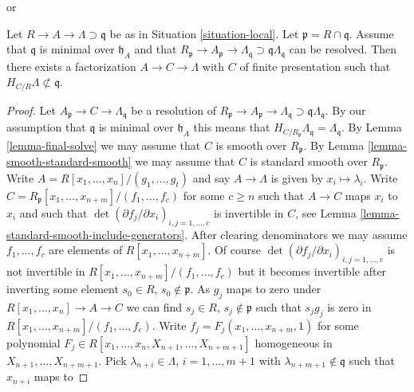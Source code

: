 \begin{lemma}
\label{lemma-delocalize-weak}
\begin{reference}
\cite[Lemma 12.2]{swan} or
\cite[Lemma 2]{popescu-GND}
\end{reference}
Let $R \to A \to \Lambda \supset \mathfrak q$ be as in
Situation \ref{situation-local}. Let $\mathfrak p = R \cap \mathfrak q$.
Assume that $\mathfrak q$ is minimal over $\mathfrak h_A$ and that
$R_\mathfrak p \to A_\mathfrak p \to \Lambda_\mathfrak q
\supset \mathfrak q\Lambda_\mathfrak q$ can be resolved.
Then there exists a factorization $A \to C \to \Lambda$ with $C$ of
finite presentation such that $H_{C/R} \Lambda \not \subset \mathfrak q$.
\end{lemma}

\begin{proof}
Let $A_\mathfrak p \to C \to \Lambda_\mathfrak q$ be a resolution of
$R_\mathfrak p \to A_\mathfrak p \to \Lambda_\mathfrak q
\supset \mathfrak q\Lambda_\mathfrak q$. By our assumption
that $\mathfrak q$ is minimal over $\mathfrak h_A$ this
means that $H_{C/R_\mathfrak p} \Lambda_\mathfrak q = \Lambda_\mathfrak q$.
By Lemma \ref{lemma-final-solve}
we may assume that $C$ is smooth over $R_\mathfrak p$.
By Lemma \ref{lemma-smooth-standard-smooth} we may assume that
$C$ is standard smooth over $R_\mathfrak p$.
Write $A = R[x_1, \ldots, x_n]/(g_1, \ldots, g_t)$ and say
$A \to \Lambda$ is given by $x_i \mapsto \lambda_i$.
Write $C = R_\mathfrak p[x_1, \ldots, x_{n + m}]/(f_1, \ldots, f_c)$
for some $c \geq n$ such that $A \to C$ maps $x_i$ to $x_i$ and such that
$\det(\partial f_j/\partial x_i)_{i, j = 1, \ldots, c}$
is invertible in $C$, see
Lemma \ref{lemma-standard-smooth-include-generators}.
After clearing denominators we may assume
$f_1, \ldots, f_c$ are elements of $R[x_1, \ldots, x_{n + m}]$.
Of course
$\det(\partial f_j/\partial x_i)_{i, j = 1, \ldots, c}$
is not invertible in $R[x_1, \ldots, x_{n + m}]/(f_1, \ldots, f_c)$
but it becomes invertible after inverting some element $s_0 \in R$,
$s_0 \not \in \mathfrak p$.
As $g_j$ maps to zero under $R[x_1, \ldots, x_n] \to A \to C$
we can find $s_j \in R$, $s_j \not \in \mathfrak p$ such that
$s_j g_j$ is zero in $R[x_1, \ldots, x_{n + m}]/(f_1, \ldots, f_c)$.
Write $f_j = F_j(x_1, \ldots, x_{n + m}, 1)$
for some polynomial
$F_j \in R[x_1, \ldots, x_n, X_{n + 1}, \ldots, X_{n + m + 1}]$
homogeneous in $X_{n + 1}, \ldots, X_{n + m + 1}$.
Pick $\lambda_{n + i} \in \Lambda$, $i = 1, \ldots, m + 1$ with
$\lambda_{n + m + 1} \not \in \mathfrak q$ such that $x_{n + i}$ maps to

\end{proof}
